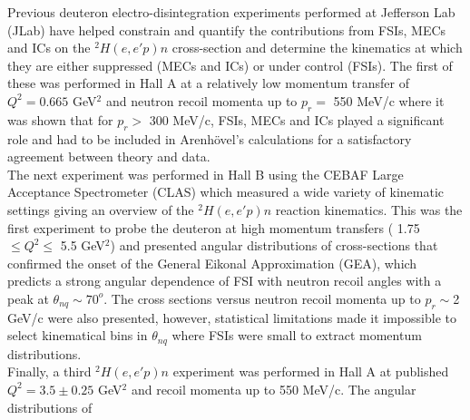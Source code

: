 \indent Previous deuteron electro-disintegration experiments performed at Jefferson Lab (JLab) have helped constrain and quantify the contributions from FSIs, MECs and ICs on
the $^{2}H(e,e'p)n$ cross-section and determine the kinematics at which they are either suppressed (MECs and ICs) or under control (FSIs). The first of these was performed in Hall A \cite{PhysRevLett.89.062301}
at a relatively low momentum transfer of $Q^{2}=0.665$ GeV$^{2}$ and neutron recoil momenta
up to $p_{r} = $ 550 MeV/c where it was shown that for $p_{r}>$ 300 MeV/c, FSIs, MECs and ICs played a significant role and had to be included in Arenh\"{o}vel's calculations \cite{PhysRevC.43.1022, PhysRevC.46.455, PhysRevC.52.1232, PhysRevC.55.2214}
for a satisfactory agreement between theory and data. \\
\indent The next experiment was performed in Hall B \cite{PhysRevLett.98.262502} using the CEBAF Large Acceptance Spectrometer (CLAS) which measured a wide variety of kinematic settings
giving an overview of the $^{2}H(e,e'p)n$ reaction kinematics. This was the first experiment to probe
the deuteron at high momentum transfers ( 1.75 $\leq Q^{2}\leq$ 5.5 GeV$^{2}$) and presented angular distributions of cross-sections that confirmed the onset of
the General Eikonal Approximation (GEA)\cite{sargsian_2001,PhysRevC.56.1124}, which predicts a strong angular dependence of FSI with neutron recoil angles with a peak at $\theta_{nq} \sim 70^{o}$.
The cross sections versus neutron recoil momenta up to $p_{r}\sim$2 GeV/c were also presented, however, statistical limitations made it impossible to select kinematical bins in $\theta_{nq}$ where
FSIs were small to extract momentum distributions.\\
\indent Finally, a third $^{2}H(e,e'p)n$ experiment was performed in Hall A \cite{PhysRevLett.107.262501} at published $Q^{2} = 3.5\pm0.25$ GeV$^{2}$ and recoil momenta up to 550 MeV/c. The angular distributions of
